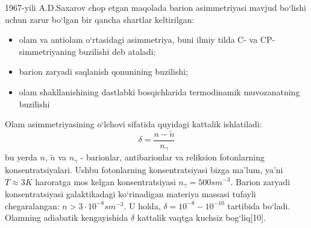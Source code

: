 \documentclass[14pt]{scrartcl}
\begin{document}
1967-yili A.D.Saxarov chop etgan maqolada barion asimmetriyasi mavjud bo`lishi uchun zarur bo`lgan bir qancha shartlar keltirilgan:
\begin{itemize}
	\item olam va antiolam o`rtasidagi asimmetriya, buni ilmiy tilda C- va CP-simmetriyaning buzilishi deb ataladi;
	\item barion zaryadi saqlanish qonunining buzilishi;
	\item olam shakllanishining dastlabki bosqichlarida termodinamik muvozanatning buzilishi
\end{itemize}

Olam asimmetriyasining o`lchovi sifatida quyidagi kattalik ishlatiladi:
\begin{equation}
\delta=\frac{n-\tilde{n}}{n_{\gamma}}
\label{1}
\end{equation}
bu yerda $n$, $\tilde{n}$ va $n_{\gamma}$ - barionlar, antibarionlar va reliksion fotonlarning konsentratsiyalari. Ushbu fotonlarning konsentratsiyasi bizga ma'lum, ya'ni $T\approx3K$ haroratga mos kelgan konsentratsiyasi $n_{
\gamma} = 500 sm^{-3}$. Barion zaryadi konsentratsiyasi galaktikadagi ko`rinadigan materiya massasi tufayli chegaralangan: $n>3\cdot10^{-8}sm^{-3}$. U holda, $\delta = 10^{-8} - 10^{-10}$ tartibida bo`ladi. Olamning adiabatik kengayishida $\delta$ kattalik vaqtga kuchsiz bog`liq[10]. 
\end{document}
